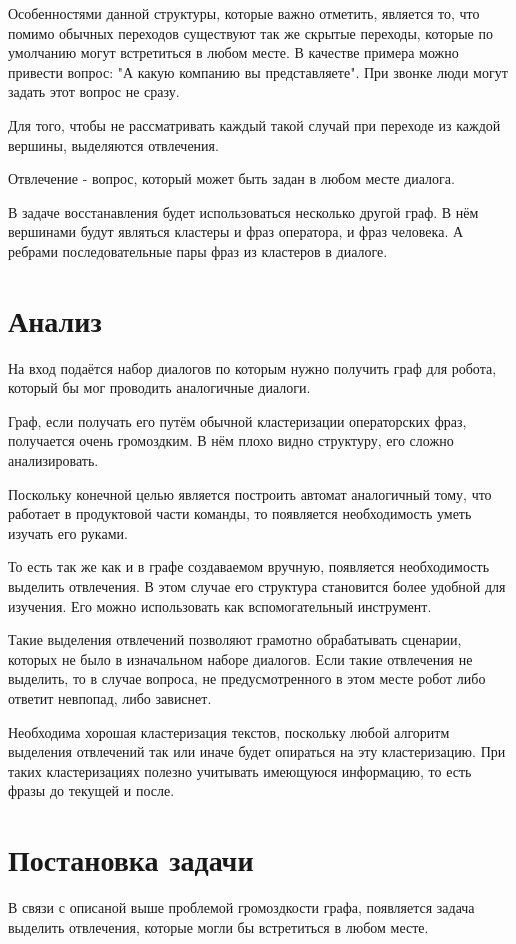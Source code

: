 \documentclass[specification,annotation]{itmo-student-thesis}
\begin{document}
	Особенностями данной структуры, которые важно отметить, является то, что помимо обычных переходов существуют так же скрытые переходы, которые по умолчанию могут встретиться в любом месте. В качестве примера можно привести вопрос: "А какую компанию вы представляете". При звонке люди могут задать этот вопрос не сразу.
	
	Для того, чтобы не рассматривать каждый такой случай при переходе из каждой вершины, выделяются $\textbf{отвлечения}$. 
	
	$\textbf{Отвлечение}$ - вопрос, который может быть задан в любом месте диалога. 
	
	В задаче восстанавления будет использоваться несколько другой граф. В нём вершинами будут являться кластеры и фраз оператора, и фраз человека. А ребрами последовательные пары фраз из кластеров в диалоге.
	
	\section{Анализ}
	На вход подаётся набор диалогов по которым нужно получить граф для робота, который бы мог проводить аналогичные диалоги.
	
	Граф, если получать его путём обычной кластеризации операторских фраз, получается очень громоздким. В нём плохо видно структуру, его сложно анализировать.
	
	Поскольку конечной целью является построить автомат аналогичный тому, что работает в продуктовой части команды, то появляется необходимость уметь изучать его руками. 
	
	То есть так же как и в графе создаваемом вручную, появляется необходимость выделить отвлечения. В этом случае его структура становится более удобной для изучения. Его можно использовать как вспомогательный инструмент. 
	
	Такие выделения отвлечений позволяют грамотно обрабатывать сценарии, которых не было в изначальном наборе диалогов. Если такие отвлечения не выделить, то в случае вопроса, не предусмотренного в этом месте робот либо ответит невпопад, либо зависнет.
	
	Необходима хорошая кластеризация текстов, поскольку любой алгоритм выделения отвлечений так или иначе будет опираться на эту кластеризацию. При таких кластеризациях полезно учитывать имеющуюся информацию, то есть фразы до текущей и после.
	
	
	\section{Постановка задачи}
	В связи с описаной выше проблемой громоздкости графа, появляется задача выделить отвлечения, которые могли бы встретиться в любом месте.
	
\end{document}
